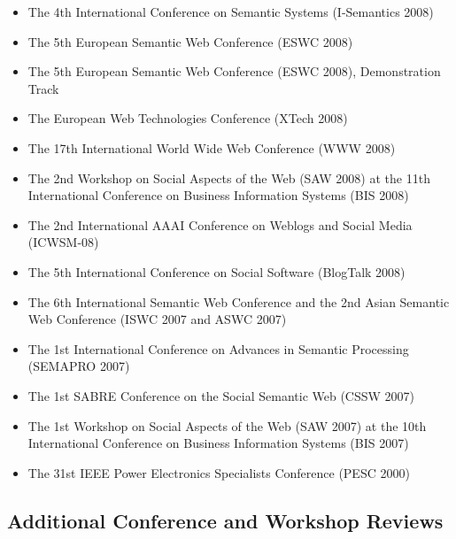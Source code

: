 \documentclass[10pt,a4paper]{res} %
\begin{document}
\begin{resume}
\begin{itemize}
\item The 4th International Conference on Semantic Systems (I-Semantics 2008)
\item The 5th European Semantic Web Conference (ESWC 2008)
\item The 5th European Semantic Web Conference (ESWC 2008), Demonstration Track
\item The European Web Technologies Conference (XTech 2008)
\item The 17th International World Wide Web Conference (WWW 2008)
\item The 2nd Workshop on Social Aspects of the Web (SAW 2008) at the 11th International Conference on Business Information Systems (BIS 2008)
\item The 2nd International AAAI Conference on Weblogs and Social Media (ICWSM-08)
\item The 5th International Conference on Social Software (BlogTalk 2008)
\item The 6th International Semantic Web Conference and the 2nd Asian Semantic Web Conference (ISWC 2007 and ASWC 2007)
\item The 1st International Conference on Advances in Semantic Processing (SEMAPRO 2007)
\item The 1st SABRE Conference on the Social Semantic Web (CSSW 2007)
\item The 1st Workshop on Social Aspects of the Web (SAW 2007) at the 10th International Conference on Business Information Systems (BIS 2007)
\item The 31st IEEE Power Electronics Specialists Conference (PESC 2000)
\end{itemize}

\subsection*{Additional Conference and Workshop Reviews}


\end{resume}
\end{document}
